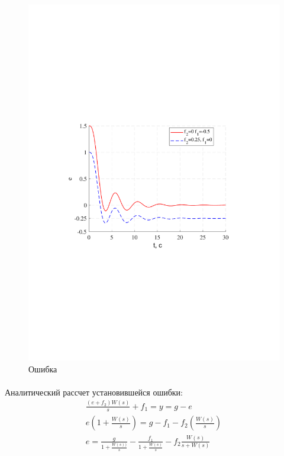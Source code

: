 \documentclass[a4paper,12pt]{article}
\begin{document}
	\begin{figure}[h!]
		\begin{center}
		\renewcommand{\figurename}{Рисунок}
		\includegraphics[width=5in]{vozm1errMOD.pdf}
		\caption{Ошибка}
		\end{center}
		\label{s_18}
		
	\end{figure}		
	\newpage
	\paragraph {} Аналитический рассчет установившейся ошибки:\\
	\begin{gather}
	\frac{(e+f_2)W(s)}{s}+f_1=y=g-e\\
	e(1+\frac{W(s)}{s})=g-f_1-f_2(\frac{W(s)}{s})\\
	e=\displaystyle \frac{g}{\displaystyle 1+\frac{W(s))}{s}}-\displaystyle\frac{f_1}{\displaystyle 1+\frac{W(s)}{s}}-f_2\frac{W(s)}{s+W(s)}
	\end{gather}
	
\end{document}
